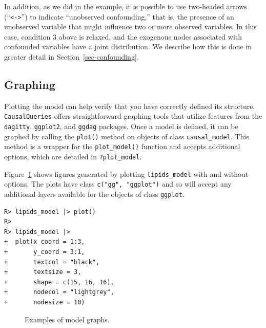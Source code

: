 \documentclass[
  11pt,
  article]{jss}
\begin{document}
In addition, as we did in the \citet{chickering_clinicians_1996}
example, it is possible to use two-headed arrows
(``\texttt{\textless{}-\textgreater{}}'') to indicate ``unobserved
confounding,'' that is, the presence of an unobserved variable that
might influence two or more observed variables. In this case, condition
3 above is relaxed, and the exogenous nodes associated with confounded
variables have a joint distribution. We describe how this is done in
greater detail in Section~\ref{sec-confounding}.

\subsection{Graphing}\label{graphing}

Plotting the model can help verify that you have correctly defined its
structure. \texttt{CausalQueries} offers straightforward graphing tools
that utilize features from the \texttt{dagitty}, \texttt{ggplot2}, and
\texttt{ggdag} packages. Once a model is defined, it can be graphed by
calling the \texttt{plot()} method on objects of class
\texttt{causal\_model}. This method is a wrapper for the
\texttt{plot\_model()} function and accepts additional options, which
are detailed in \texttt{?plot\_model}.

Figure~\ref{fig-plots} shows figures generated by plotting
\texttt{lipids\_model} with and without options. The plots have class
\texttt{c("gg",\ "ggplot")} and so will accept any additional layers
available for the objects of class \texttt{ggplot}.

\begin{verbatim}
R> lipids_model |> plot()
R> 
R> lipids_model |>
+  plot(x_coord = 1:3,
+       y_coord = 3:1,
+       textcol = "black",
+       textsize = 3,
+       shape = c(15, 16, 16),
+       nodecol = "lightgrey",
+       nodesize = 10)
\end{verbatim}

\begin{figure}[h]

\begin{minipage}{0.50\linewidth}



\end{minipage}%
%
\begin{minipage}{0.50\linewidth}



\end{minipage}%

\caption{\label{fig-plots}Examples of model graphs.}

\end{figure}%
\end{document}

